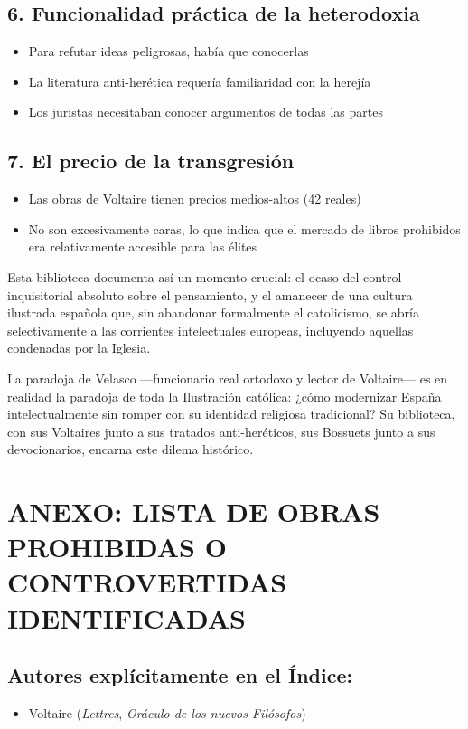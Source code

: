 \documentclass[12pt,a4paper]{article}
\begin{document}
\subsection*{6. Funcionalidad práctica de la heterodoxia}
\begin{itemize}
    \item Para refutar ideas peligrosas, había que conocerlas
    \item La literatura anti-herética requería familiaridad con la herejía
    \item Los juristas necesitaban conocer argumentos de todas las partes
\end{itemize}

\subsection*{7. El precio de la transgresión}
\begin{itemize}
    \item Las obras de Voltaire tienen precios medios-altos (42 reales)
    \item No son excesivamente caras, lo que indica que el mercado de libros prohibidos era relativamente accesible para las élites
\end{itemize}

Esta biblioteca documenta así un momento crucial: el ocaso del control inquisitorial absoluto sobre el pensamiento, y el amanecer de una cultura ilustrada española que, sin abandonar formalmente el catolicismo, se abría selectivamente a las corrientes intelectuales europeas, incluyendo aquellas condenadas por la Iglesia.

La paradoja de Velasco ---funcionario real ortodoxo y lector de Voltaire--- es en realidad la paradoja de toda la Ilustración católica: ¿cómo modernizar España intelectualmente sin romper con su identidad religiosa tradicional? Su biblioteca, con sus Voltaires junto a sus tratados anti-heréticos, sus Bossuets junto a sus devocionarios, encarna este dilema histórico.

\section*{ANEXO: LISTA DE OBRAS PROHIBIDAS O CONTROVERTIDAS IDENTIFICADAS}

\subsection*{Autores explícitamente en el Índice:}
\begin{itemize}
    \item Voltaire (\textit{Lettres}, \textit{Oráculo de los nuevos Filósofos})
\end{itemize}
\end{document}
